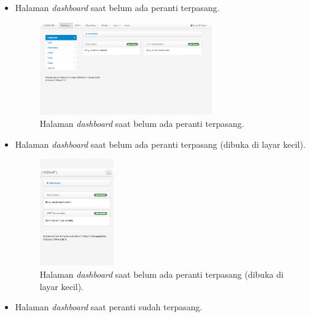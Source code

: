 			\begin{itemize}
				\item Halaman \emph{dashboard} saat belum ada peranti terpasang.

					\begin{figure}[ht!]
					  \centering
					    \includegraphics[width=0.7\textwidth]{gambar/dashboard}
					    \caption{Halaman \emph{dashboard} saat belum ada peranti terpasang.}
					    \label{add-iqrf}
					\end{figure}

				\item Halaman \emph{dashboard} saat belum ada peranti terpasang (dibuka di layar kecil).

					\begin{figure}[ht!]
					  \centering
					    \includegraphics[width=0.3\textwidth]{gambar/dashboard-small}
					    \caption{Halaman \emph{dashboard} saat belum ada peranti terpasang (dibuka di layar kecil).}
					    \label{add-iqrf}
					\end{figure}

				\item Halaman \emph{dashboard} saat peranti sudah terpasang.


\end{itemize}
